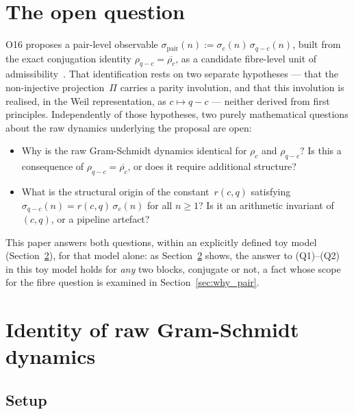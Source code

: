 \documentclass[11pt,a4paper]{article}
\theoremstyle{definition}
\begin{document}
    \clearpage
    \tableofcontents

    \clearpage

  \section{The open question}
  \label{sec:problem}

  O16 proposes a pair-level observable
  $\sigma_{\mathrm{pair}}(n) := \sigma_c(n)\,\sigma_{q-c}(n)$, built from
  the exact conjugation identity $\rho_{q-c}=\overline{\rho_c}$, as a
  candidate fibre-level unit of admissibility~\cite{Beau2026a20}.
  That identification rests on two separate hypotheses --- that the
  non-injective projection~$\Pi$ carries a parity involution, and that
  this involution is realised, in the Weil representation, as
  $c \mapsto q-c$ --- neither derived from first principles.
  Independently of those hypotheses, two purely mathematical questions
  about the raw dynamics underlying the proposal are open:

  \begin{itemize}
    \item[(Q1)] Why is the raw Gram-Schmidt dynamics identical for
    $\rho_c$ and $\rho_{q-c}$?
    Is this a consequence of $\rho_{q-c} = \overline{\rho_c}$,
    or does it require additional structure?

    \item[(Q2)] What is the structural origin of the
    constant~$r(c,q)$ satisfying
    $\sigma_{q-c}(n) = r(c,q)\,\sigma_c(n)$ for all $n \geq 1$?
    Is it an arithmetic invariant of $(c,q)$, or a pipeline artefact?
  \end{itemize}

  This paper answers both questions, within an explicitly defined toy
  model (Section~\ref{sec:identity}), for that model alone: as
  Section~\ref{sec:identity} shows, the answer to (Q1)--(Q2) in this toy
  model holds for \emph{any} two blocks, conjugate or not, a fact whose
  scope for the fibre question is examined in
  Section~\ref{sec:why_pair}.

  \section{Identity of raw Gram-Schmidt dynamics}
  \label{sec:identity}

  \subsection{Setup}
\end{document}
